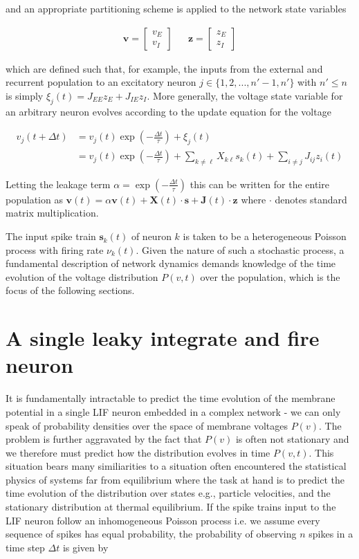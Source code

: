 \documentclass{ucetd}
\begin{document}
and an appropriate partitioning scheme is applied to the network state variables

\begin{align}
\mathbf{v} = \begin{bmatrix}
    v_{E}\\
    v_{I} 
\end{bmatrix}  && \mathbf{z} = \begin{bmatrix}
    z_{E}\\
    z_{I} 
\end{bmatrix} 
\end{align}

which are defined such that, for example, the inputs from the external and recurrent population to an excitatory neuron $j \in \{1, 2, ..., n'-1, n'\}$ with $n' \leq n$ is simply $\xi_{j}(t) = J_{EE}z_{E} + J_{IE}z_{I}$. More generally, the voltage state variable for an arbitrary neuron evolves according to the update equation for the voltage 

\begin{align*}
v_{j}(t+\Delta t) &= v_{j}(t)\exp\left(-\frac{\Delta t}{\tau}\right) + \xi_{j}(t)\\
&= v_{j}(t)\exp\left(-\frac{\Delta t}{\tau}\right) + \sum_{k\neq \ell}X_{k\ell}s_{k}(t) + \sum_{i\neq j} J_{ij}z_{i}(t)
\end{align*}

Letting the leakage term $\alpha = \exp\left(-\frac{\Delta t}{\tau}\right)$ this can be written for the entire population as $\mathbf{v}(t) = \alpha\mathbf{v}(t) + \mathbf{X}(t)\cdot \mathbf{s} + \mathbf{J}(t)\cdot \mathbf{z}$ where $\cdot$ denotes standard matrix multiplication. 

The input spike train $\mathbf{s}_{k}(t)$ of neuron $k$ is taken to be a heterogeneous Poisson process with firing rate $\nu_{k}(t)$. Given the nature of such a stochastic process, a fundamental description of network dynamics demands knowledge of the time evolution of the voltage distribution $P(v,t)$ over the population, which is the focus of the following sections.

\section{A single leaky integrate and fire neuron}

It is fundamentally intractable to predict the time evolution of the membrane potential in a single LIF neuron embedded in a complex network - we can only speak of probability densities over the space of membrane voltages $P(v)$. The problem is further aggravated by the fact that $P(v)$ is often not stationary and we therefore must predict how the distribution evolves in time $P(v,t)$. This situation bears many similiarities to a situation often encountered the statistical physics of systems far from equilibrium where the task at hand is to predict the time evolution of the distribution over states e.g., particle velocities, and the stationary distribution at thermal equilibrium. If the spike trains input to the LIF neuron follow an inhomogeneous Poisson process i.e. we assume every sequence of spikes has equal probability, the probability of observing $n$ spikes in a time step $\Delta t$ is given by
\end{document}
